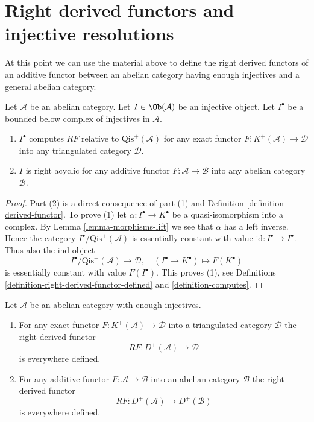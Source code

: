 \section{Right derived functors and injective resolutions}
\label{section-right-derived-functor}

\noindent
At this point we can use the material above to define the right derived
functors of an additive functor between an abelian category having
enough injectives and a general abelian category.

\begin{lemma}
\label{lemma-injective-acyclic}
Let $\mathcal{A}$ be an abelian category.
Let $I \in \Ob(\mathcal{A})$ be an injective object.
Let $I^\bullet$ be a bounded below complex of injectives in $\mathcal{A}$.
\begin{enumerate}
\item $I^\bullet$ computes $RF$ relative to $\text{Qis}^{+}(\mathcal{A})$
for any exact functor $F : K^{+}(\mathcal{A}) \to \mathcal{D}$
into any triangulated category $\mathcal{D}$.
\item $I$ is right acyclic for any additive functor
$F : \mathcal{A} \to \mathcal{B}$ into any abelian category $\mathcal{B}$.
\end{enumerate}
\end{lemma}

\begin{proof}
Part (2) is a direct consequence of part (1) and
Definition \ref{definition-derived-functor}.
To prove (1) let $\alpha : I^\bullet \to K^\bullet$ be a quasi-isomorphism
into a complex. By
Lemma \ref{lemma-morphisms-lift}
we see that $\alpha$ has a left inverse. Hence the category
$I^\bullet/\text{Qis}^{+}(\mathcal{A})$ is essentially constant with value
$\text{id} : I^\bullet \to I^\bullet$. Thus also the ind-object
$$
I^\bullet/\text{Qis}^{+}(\mathcal{A}) \longrightarrow \mathcal{D}, \quad
(I^\bullet \to K^\bullet) \longmapsto F(K^\bullet)
$$
is essentially constant with value $F(I^\bullet)$. This proves (1), see
Definitions \ref{definition-right-derived-functor-defined} and
\ref{definition-computes}.
\end{proof}

\begin{lemma}
\label{lemma-enough-injectives-right-derived}
Let $\mathcal{A}$ be an abelian category with enough injectives.
\begin{enumerate}
\item For any exact functor $F : K^{+}(\mathcal{A}) \to \mathcal{D}$
into a triangulated category $\mathcal{D}$ the right derived
functor
$$
RF : D^{+}(\mathcal{A}) \longrightarrow \mathcal{D}
$$
is everywhere defined.
\item For any additive functor $F : \mathcal{A} \to \mathcal{B}$ into an
abelian category $\mathcal{B}$ the right derived functor
$$
RF : D^{+}(\mathcal{A}) \longrightarrow D^{+}(\mathcal{B})
$$
is everywhere defined.
\end{enumerate}
\end{lemma}

